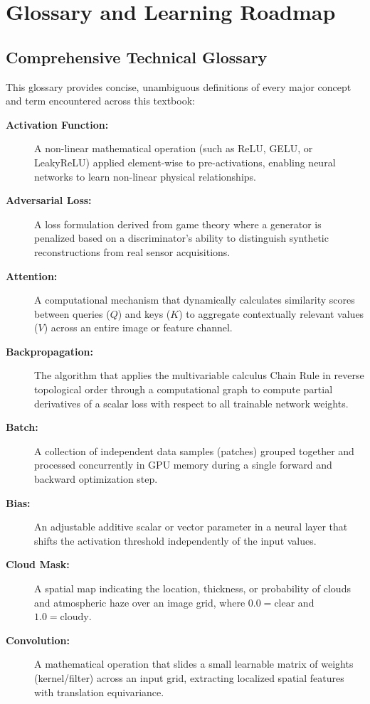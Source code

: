 \chapter{Glossary and Learning Roadmap}
\label{chap:ch24}

\section{Comprehensive Technical Glossary}
This glossary provides concise, unambiguous definitions of every major concept and term encountered across this textbook:

\begin{description}
    \item[\textbf{Activation Function:}] A non-linear mathematical operation (such as ReLU, GELU, or LeakyReLU) applied element-wise to pre-activations, enabling neural networks to learn non-linear physical relationships.
    \item[\textbf{Adversarial Loss:}] A loss formulation derived from game theory where a generator is penalized based on a discriminator's ability to distinguish synthetic reconstructions from real sensor acquisitions.
    \item[\textbf{Attention:}] A computational mechanism that dynamically calculates similarity scores between queries ($Q$) and keys ($K$) to aggregate contextually relevant values ($V$) across an entire image or feature channel.
    \item[\textbf{Backpropagation:}] The algorithm that applies the multivariable calculus Chain Rule in reverse topological order through a computational graph to compute partial derivatives of a scalar loss with respect to all trainable network weights.
    \item[\textbf{Batch:}] A collection of independent data samples (patches) grouped together and processed concurrently in GPU memory during a single forward and backward optimization step.
    \item[\textbf{Bias:}] An adjustable additive scalar or vector parameter in a neural layer that shifts the activation threshold independently of the input values.
    \item[\textbf{Cloud Mask:}] A spatial map indicating the location, thickness, or probability of clouds and atmospheric haze over an image grid, where $0.0 = \text{clear}$ and $1.0 = \text{cloudy}$.
    \item[\textbf{Convolution:}] A mathematical operation that slides a small learnable matrix of weights (kernel/filter) across an input grid, extracting localized spatial features with translation equivariance.

\end{description}
